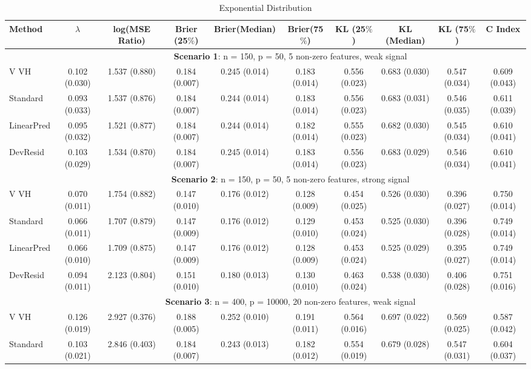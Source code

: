 \documentclass{article}
\begin{document}
\begin{landscape}
\begin{table}[ht]
\caption{\label{Tab:exp} Exponential Distribution}
\centering
\begin{tabular}[t]{lccccccccc}
\toprule
 Method & $\lambda$ & log(MSE Ratio) & Brier (25$\%$) & Brier(Median) & Brier(75$\%$) & KL (25$\%$)& KL (Median) & KL (75$\%$) & C Index\\
\midrule
&\multicolumn{9}{c}{\textbf{Scenario 1}: n = 150, p = 50, 5 non-zero features, weak signal}\\
\cline{2-10}
V VH  & 0.102 (0.030) & 1.537 (0.880) & 0.184 (0.007) & 0.245 (0.014) & 0.183 (0.014) & 0.556 (0.023) & 0.683 (0.030) & 0.547 (0.034) & 0.609 (0.043) \\    
Standard  & 0.093 (0.033) & 1.537 (0.876) & 0.184 (0.007) & 0.244 (0.014) & 0.183 (0.014) & 0.556 (0.023) & 0.683 (0.031) & 0.546 (0.035) & 0.611 (0.039) \\    
LinearPred  & 0.095 (0.032) & 1.521 (0.877) & 0.184 (0.007) & 0.244 (0.014) & 0.182 (0.014) & 0.555 (0.023) & 0.682 (0.030) & 0.545 (0.034) & 0.610 (0.041) \\    
DevResid  & 0.103 (0.029) & 1.534 (0.870) & 0.184 (0.007) & 0.245 (0.014) & 0.183 (0.014) & 0.556 (0.023) & 0.683 (0.029) & 0.546 (0.034) & 0.610 (0.041) \\
\addlinespace
&\multicolumn{9}{c}{\textbf{Scenario 2}: n = 150, p = 50, 5 non-zero features, strong signal}\\
\cline{2-10}
 V VH  & 0.070 (0.011) & 1.754 (0.882) & 0.147 (0.010) & 0.176 (0.012) & 0.128 (0.009) & 0.454 (0.025) & 0.526 (0.030) & 0.396 (0.027) & 0.750 (0.014) \\  
 Standard  & 0.066 (0.011) & 1.707 (0.879) & 0.147 (0.009) & 0.176 (0.012) & 0.129 (0.010) & 0.453 (0.024) & 0.525 (0.030) & 0.396 (0.028) & 0.749 (0.014) \\   
 LinearPred  & 0.066 (0.010) & 1.709 (0.875) & 0.147 (0.009) & 0.176 (0.012) & 0.128 (0.009) & 0.453 (0.024) & 0.525 (0.029) & 0.395 (0.027) & 0.749 (0.014) \\  
 DevResid  & 0.094 (0.011) & 2.123 (0.804) & 0.151 (0.010) & 0.180 (0.013) & 0.130 (0.010) & 0.463 (0.024) & 0.538 (0.030) & 0.406 (0.028) & 0.751 (0.016) \\
\addlinespace
&\multicolumn{9}{c}{\textbf{Scenario 3}: n = 400, p = 10000, 20 non-zero features, weak signal}\\
\cline{2-10}
 V VH  & 0.126 (0.019) & 2.927 (0.376) & 0.188 (0.005) & 0.252 (0.010) & 0.191 (0.011) & 0.564 (0.016) & 0.697 (0.022) & 0.569 (0.025) & 0.587 (0.042) \\
 Standard  & 0.103 (0.021) & 2.846 (0.403) & 0.184 (0.007) & 0.243 (0.013) & 0.182 (0.012) & 0.554 (0.019) & 0.679 (0.028) & 0.547 (0.031) & 0.604 (0.037) \\

\end{tabular}
\end{table}
\end{landscape}
\end{document}
